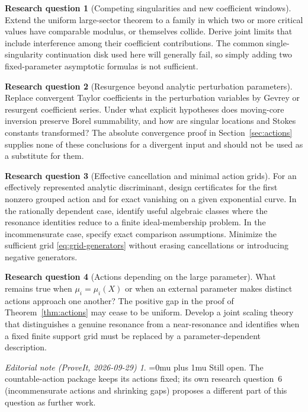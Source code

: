 \documentclass[11pt,a4paper]{article}
\theoremstyle{definition}
\newtheorem{question}{Research question}[section]
\theoremstyle{remark}
\newtheorem*{ednoteinner}{Editorial note (ProveIt, 2026-09-29)}
\newenvironment{ednote}{\begin{ednoteinner}\sloppy\Urlmuskip=0mu plus 1mu\relax}{\end{ednoteinner}}
\begin{document}
\begin{question}[Competing singularities and new coefficient windows]
Extend the uniform large-sector theorem to a family in which two or more
critical values have comparable modulus, or themselves collide. Derive
joint limits that include interference among their coefficient
contributions. The common single-singularity continuation disk used here
will generally fail, so simply adding two fixed-parameter asymptotic
formulas is not sufficient.
\end{question}

\begin{question}[Resurgence beyond analytic perturbation parameters]
Replace convergent Taylor coefficients in the perturbation variables by
Gevrey or resurgent coefficient series. Under what explicit hypotheses
does moving-core inversion preserve Borel summability, and how are
singular locations and Stokes constants transformed? The absolute
convergence proof in Section~\ref{sec:actions} supplies none of these
conclusions for a divergent input and should not be used as a substitute
for them.
\end{question}

\begin{question}[Effective cancellation and minimal action grids]
For an effectively represented analytic discriminant, design certificates
for the first nonzero grouped action and for exact vanishing on a given
exponential curve. In the rationally dependent case, identify useful
algebraic classes where the resonance identities reduce to a finite
ideal-membership problem. In the incommensurate case, specify exact
comparison assumptions. Minimize the sufficient grid
\eqref{eq:grid-generators} without erasing cancellations or introducing
negative generators.
\end{question}

\begin{question}[Actions depending on the large parameter]
What remains true when $\mu_i=\mu_i(X)$ or when an external parameter
makes distinct actions approach one another? The positive gap in the
proof of Theorem~\ref{thm:actions} may cease to be uniform. Develop a
joint scaling theory that distinguishes a genuine resonance from a
near-resonance and identifies when a fixed finite support grid must be
replaced by a parameter-dependent description.
\end{question}
\begin{ednote}
Still open. The countable-action package
 keeps its actions
fixed; its own research question~6 (incommensurate actions and shrinking
gaps) proposes a different part of this question as further work.
\end{ednote}
\end{document}
